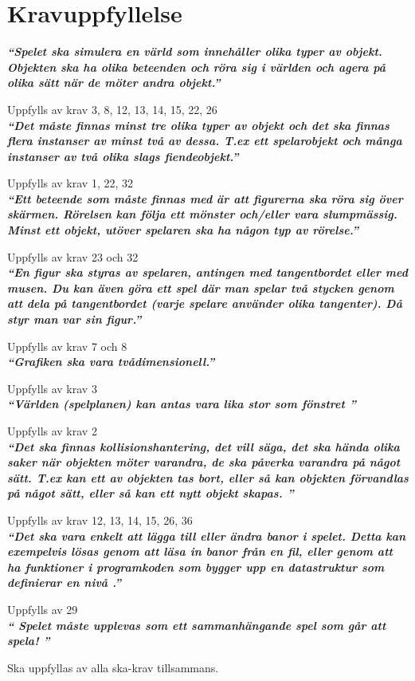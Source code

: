 \documentclass{TDP005mall}
\begin{document}
\section{Kravuppfyllelse}
\textit{\textbf{``Spelet ska simulera en värld som innehåller olika typer av objekt. Objekten ska ha olika beteenden och röra sig i världen och agera på olika sätt när de möter andra objekt.''}}


Uppfylls av krav 3, 8, 12, 13, 14, 15, 22, 26\\


\textit{\textbf{``Det måste finnas minst tre olika typer av objekt och det ska finnas flera instanser av minst två av dessa. T.ex ett spelarobjekt och många instanser av två olika slags fiendeobjekt.''}}


Uppfylls av krav 1, 22, 32\\

\textit{\textbf{``Ett beteende som måste finnas med är att figurerna ska röra sig över skärmen. Rörelsen kan följa ett mönster och/eller vara slumpmässig. Minst ett objekt, utöver spelaren ska ha någon typ av rörelse.''}}


Uppfylls av krav 23 och 32\\

\textit{\textbf{``En figur ska styras av spelaren, antingen med tangentbordet eller med musen. Du kan även göra ett spel där man spelar två stycken genom att dela på tangentbordet (varje spelare använder olika tangenter). Då styr man var sin figur.''}}


Uppfylls av krav 7 och 8\\

\textit{\textbf{``Grafiken ska vara tvådimensionell.''}}


Uppfylls av krav 3\\

\textit{\textbf{``Världen (spelplanen) kan antas vara lika stor som fönstret ''}}


Uppfylls av krav 2\\

\textit{\textbf{``Det ska finnas kollisionshantering, det vill säga, det ska hända olika saker när objekten möter varandra, de ska påverka varandra på något sätt. T.ex kan ett av objekten tas bort, eller så kan objekten förvandlas på något sätt, eller så kan ett nytt objekt skapas. ''}}


Uppfylls av krav 12, 13, 14, 15, 26, 36\\

\textit{\textbf{``Det ska vara enkelt att lägga till eller ändra banor i spelet. Detta kan exempelvis lösas genom att läsa in banor från en fil, eller genom att ha funktioner i programkoden som bygger upp en datastruktur som definierar en  nivå .''}}


Uppfylls av 29\\

\textit{\textbf{`` Spelet måste upplevas som ett sammanhängande spel som går att spela! ''}}

Ska uppfyllas av alla ska-krav tillsammans.
\end{document}
